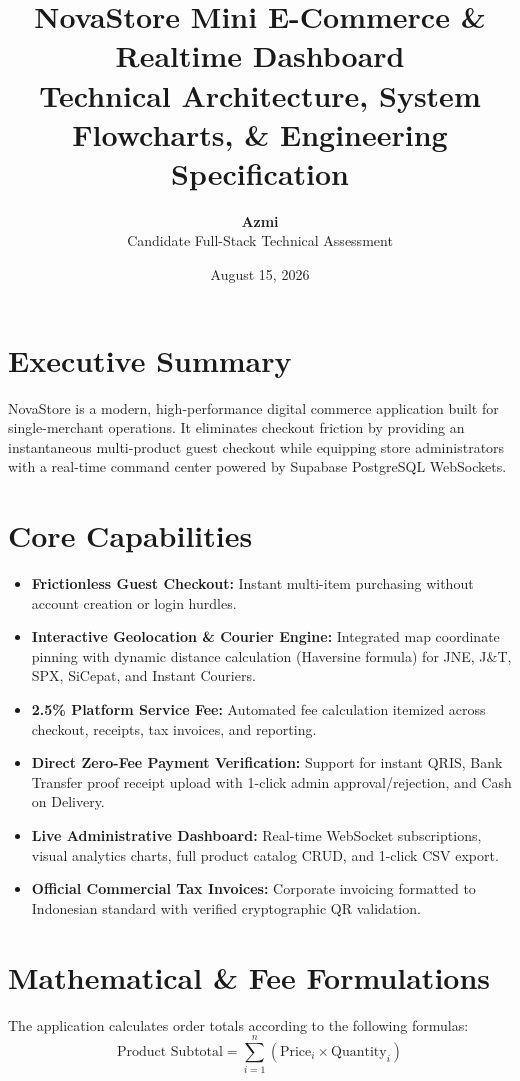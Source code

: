 \documentclass[11pt,a4paper]{article}
\title{\textbf{\Huge NovaStore Mini E-Commerce \& Realtime Dashboard}\\[0.5em]
\Large Technical Architecture, System Flowcharts, \& Engineering Specification}
\author{\textbf{Azmi} \\ Candidate Full-Stack Technical Assessment}
\date{August 15, 2026}
\begin{document}
\maketitle
\tableofcontents
\newpage

\section{Executive Summary}
NovaStore is a modern, high-performance digital commerce application built for single-merchant operations. It eliminates checkout friction by providing an instantaneous multi-product guest checkout while equipping store administrators with a real-time command center powered by Supabase PostgreSQL WebSockets.

\section{Core Capabilities}
\begin{itemize}
    \item \textbf{Frictionless Guest Checkout:} Instant multi-item purchasing without account creation or login hurdles.
    \item \textbf{Interactive Geolocation \& Courier Engine:} Integrated map coordinate pinning with dynamic distance calculation (Haversine formula) for JNE, J\&T, SPX, SiCepat, and Instant Couriers.
    \item \textbf{2.5\% Platform Service Fee:} Automated fee calculation itemized across checkout, receipts, tax invoices, and reporting.
    \item \textbf{Direct Zero-Fee Payment Verification:} Support for instant QRIS, Bank Transfer proof receipt upload with 1-click admin approval/rejection, and Cash on Delivery.
    \item \textbf{Live Administrative Dashboard:} Real-time WebSocket subscriptions, visual analytics charts, full product catalog CRUD, and 1-click CSV export.
    \item \textbf{Official Commercial Tax Invoices:} Corporate invoicing formatted to Indonesian standard with verified cryptographic QR validation.
\end{itemize}

\section{Mathematical \& Fee Formulations}
The application calculates order totals according to the following formulas:
\begin{equation}
\text{Product Subtotal} = \sum_{i=1}^{n} (\text{Price}_i \times \text{Quantity}_i)
\end{equation}
\end{document}
